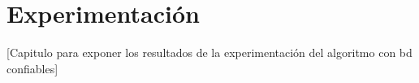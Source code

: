 \chapter{Experimentaci\'on}\label{chapter:results}

[Capitulo para exponer los resultados de la experimentaci\'on del algoritmo con bd confiables]